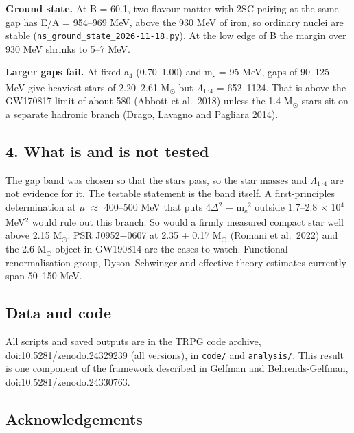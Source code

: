 \documentclass[
  11pt,
]{article}
\begin{document}
\textbf{Ground state.} At B = 60.1, two-flavour matter with 2SC pairing at the same gap has E/A = 954--969 MeV, above the 930 MeV of iron, so ordinary nuclei are stable (\texttt{ns\_ground\_state\_2026-11-18.py}). At the low edge of B the margin over 930 MeV shrinks to 5--7 MeV.

\textbf{Larger gaps fail.} At fixed a\ensuremath{_{4}} (0.70--1.00) and m\textsubscript{s} = 95 MeV, gaps of 90--125 MeV give heaviest stars of 2.20--2.61 M\ensuremath{_{\odot}} but \ensuremath{\Lambda}\ensuremath{_{1}}.\ensuremath{_{4}} = 652--1124. That is above the GW170817 limit of about 580 (Abbott et al.~2018) unless the 1.4 M\ensuremath{_{\odot}} stars sit on a separate hadronic branch (Drago, Lavagno and Pagliara 2014).

\hypertarget{what-is-and-is-not-tested}{%
\subsection{4. What is and is not tested}\label{what-is-and-is-not-tested}}

The gap band was chosen so that the stars pass, so the star masses and \ensuremath{\Lambda}\ensuremath{_{1}}.\ensuremath{_{4}} are not evidence for it. The testable statement is the band itself. A first-principles determination at \ensuremath{\mu} \ensuremath{\approx} 400--500 MeV that puts 4\ensuremath{\Delta}\ensuremath{^{2}} \ensuremath{-} m\textsubscript{s}\ensuremath{^{2}} outside 1.7--2.8 \ensuremath{\times} 10\ensuremath{^{4}} MeV\ensuremath{^{2}} would rule out this branch. So would a firmly measured compact star well above 2.15 M\ensuremath{_{\odot}}: PSR J0952\ensuremath{-}0607 at 2.35 \ensuremath{\pm} 0.17 M\ensuremath{_{\odot}} (Romani et al.~2022) and the 2.6 M\ensuremath{_{\odot}} object in GW190814 are the cases to watch. Functional-renormalisation-group, Dyson--Schwinger and effective-theory estimates currently span 50--150 MeV.

\hypertarget{data-and-code}{%
\subsection{Data and code}\label{data-and-code}}

All scripts and saved outputs are in the TRPG code archive, doi:10.5281/zenodo.24329239 (all versions), in \texttt{code/} and \texttt{analysis/}. This result is one component of the framework described in Gelfman and Behrends-Gelfman, doi:10.5281/zenodo.24330763.

\hypertarget{acknowledgements}{%
\subsection{Acknowledgements}\label{acknowledgements}}
\end{document}
